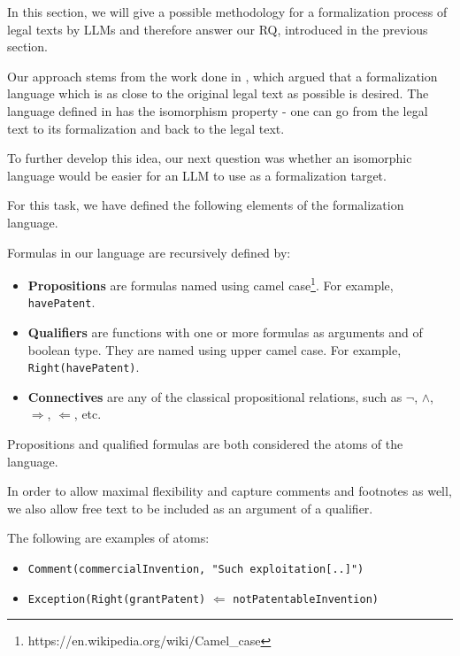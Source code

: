 In this section, we will give a possible methodology for a formalization process of legal texts by LLMs and therefore answer our RQ, introduced in the previous section.

Our approach stems from the work done in \cite{libal2023legal}, which argued that a formalization language which is as close to the original legal text as possible is desired. The language defined in \cite{libal2023legal} has the isomorphism property - one can go from the legal text to its formalization and back to the legal text.

To further develop this idea, our next question was whether an isomorphic language would be easier for an LLM to use as a formalization target.

For this task, we have defined the following elements of the formalization language.

\begin{definition}
Formulas in our language are recursively defined by:
\begin{itemize}
    \item {\bf Propositions} are formulas named using camel case\footnote{https://en.wikipedia.org/wiki/Camel\_case}. 
    For example, \texttt{havePatent}.
    \item {\bf Qualifiers} are functions with one or more formulas as arguments and of boolean type. They are named using upper camel case. For example, \texttt{Right(havePatent)}.
    \item {\bf Connectives} are any of the classical propositional relations, such as $\neg$, $\wedge$, $\Rightarrow$, $\Leftarrow$, etc.
\end{itemize}
Propositions and qualified formulas are both considered the atoms of the language.
\end{definition}

In order to allow maximal flexibility and capture comments and footnotes as well, we also allow free text to be included as an argument of a qualifier.

\begin{example}
    The following are examples of atoms:
    \begin{itemize}
    \item \texttt{Comment(commercialInvention, "Such exploitation[..]")}
        \item \texttt{Exception(Right(grantPatent)} $\Leftarrow$ \texttt{notPatentableInvention)} 
    \end{itemize}
\end{example}


